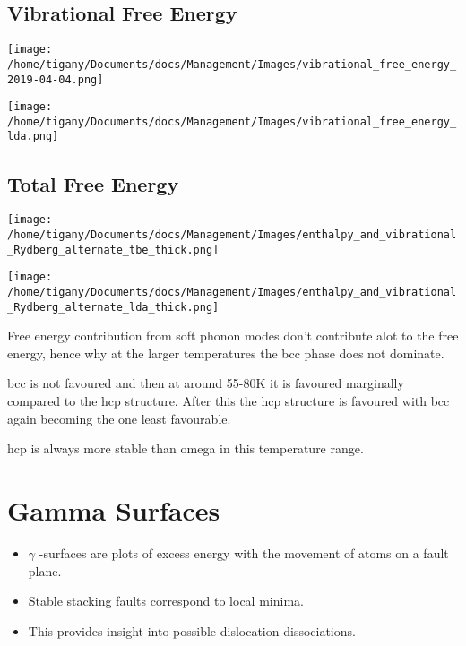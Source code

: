 \documentclass[11pt]{article}
\begin{document}
\subsection*{Vibrational Free Energy}
\label{sec:orgda774f8}
\begin{center}
\texttt{[image: /home/tigany/Documents/docs/Management/Images/vibrational\_free\_energy\_2019-04-04.png]}
\label{org18cd2fa}
\end{center}

\begin{center}
\texttt{[image: /home/tigany/Documents/docs/Management/Images/vibrational\_free\_energy\_lda.png]}
\end{center}

\subsection*{Total Free Energy}
\label{sec:orgf665cf0}
\begin{center}
\texttt{[image: /home/tigany/Documents/docs/Management/Images/enthalpy\_and\_vibrational\_Rydberg\_alternate\_tbe\_thick.png]}
\label{orgd46b59b}
\end{center}


\begin{center}
\texttt{[image: /home/tigany/Documents/docs/Management/Images/enthalpy\_and\_vibrational\_Rydberg\_alternate\_lda\_thick.png]}
\end{center}


\begin{NOTES}



Free energy contribution from soft phonon modes don't contribute alot to the
free energy, hence why at the larger temperatures the bcc phase does not
dominate. 

bcc is not favoured and then at around 55-80K it is favoured marginally compared
to the hcp structure. 
After this the hcp structure is favoured with bcc again becoming the one least
favourable. 

hcp is always more stable than omega in this temperature range. 
\end{NOTES}

\section*{Gamma Surfaces}
\label{sec:org0b1eb9f}


\begin{itemize}
\item \(\gamma\) -surfaces are plots of excess energy with the movement of
atoms on a fault plane.
\item Stable stacking faults correspond to local minima.
\item This provides insight into possible dislocation dissociations.
\end{itemize}
\end{document}
